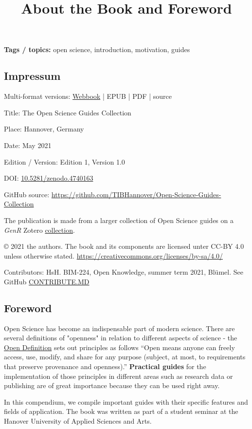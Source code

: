 \documentclass{article}
\begin{document}
\title{About the Book and Foreword}

\maketitle


\textbf{Tags / topics:} open science, introduction, motivation, guides


\subsection{Impressum}\label{H8810070}



Multi-format versions: \href{https://vivliostyle.vercel.app/#src=https://tibhannover.github.io/Open-Science-Guides-Collection/html/index.html&bookMode=true}{Webbook} | EPUB | PDF | source


Title: The Open Science Guides Collection


Place: Hannover, Germany


Date: May 2021


Edition / Version: Edition 1, Version 1.0


DOI: \href{https://doi.org/10.5281/zenodo.4740163}{10.5281/zenodo.4740163}


GitHub source: \href{https://github.com/TIBHannover/Open-Science-Guides-Collection}{https://github.com/TIBHannover/Open-Science-Guides-Collection} 


The publication is made from a larger collection of Open Science guides on a \emph{GenR} Zotero \href{https://www.zotero.org/groups/1838445/generation_r/collections/DND4FSHT}{collection}.


© 2021 the authors. The book and its components are licensed unter CC-BY 4.0 unless otherwise stated. \href{https://creativecommons.org/licenses/by-sa/4.0/}{https://creativecommons.org/licenses/by-sa/4.0/} 


Contributors: HsH. BIM-224, Open Knowledge, summer term 2021, Blümel. See GitHub \href{https://github.com/TIBHannover/Open-Science-Guides-Collection/blob/main/CONTRIBUTE.MD}{CONTRIBUTE.MD} 


\subsection{Foreword}\label{H592737}



Open Science has become an indispensable part of modern science. There are several definitions of "openness" in relation to different aspects of science - the \href{https://opendefinition.org/}{Open Definition} sets out principles as follows “Open means anyone can freely access, use, modify, and share for any purpose (subject, at most, to requirements that preserve provenance and openness).” \textbf{Practical guides} for the implementation of those principles in different areas such as research data or publishing are of great importance because they can be used right away. 


In this compendium, we compile important guides with their specific features and fields of application. The book was written as part of a student seminar at the Hanover University of Applied Sciences and Arts.
\end{document}
